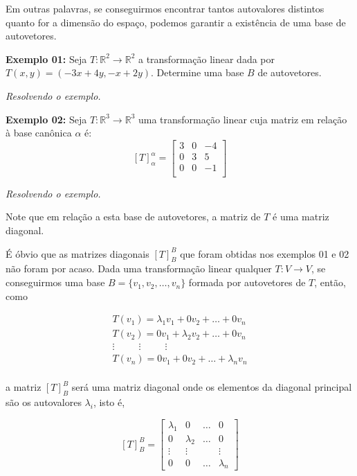 \documentclass[oneside,a4paper,12pt]{article}
\begin{document}
Em outras palavras, se conseguirmos encontrar tantos autovalores distintos quanto for a dimensão do espaço, podemos garantir a existência de uma base de autovetores.

{\bf Exemplo 01:} Seja $T:\mathbb{R}^2 \rightarrow \mathbb{R}^2$ a transformação linear dada por $T(x,y) = (-3x + 4y, -x + 2y)$. Determine uma base $B$ de autovetores.

\vspace{50pt}
\emph{Resolvendo o exemplo.}

{\bf Exemplo 02:} Seja $T: \mathbb{R}^3 \rightarrow \mathbb{R}^3$ uma transformação linear cuja matriz em relação à base canônica $\alpha$ é:
$$[T]^{\alpha}_{\alpha} = \left[
\begin{array}{ccc}
3	&	0	&	-4\\
0	&	3	&	5 \\
0	&	0	&	-1	\\
\end{array}
\right]$$

\vspace{50pt}
\emph{Resolvendo o exemplo.}

Note que em relação a esta base de autovetores, a matriz de $T$ é uma matriz diagonal.

É óbvio que as matrizes diagonais $[T]_{B}^{B}$ que foram obtidas nos exemplos 01 e 02 não foram por acaso. Dada uma transformação linear qualquer $T:V \rightarrow V$, se conseguirmos uma base $B=\{ v_1, v_2, \dots, v_n \}$ formada por autovetores de $T$, então, como

\begin{eqnarray*}
	T(v_1) = \lambda_1 v_1 + 0v_2 + \dots + 0v_n \\
	T(v_2) = 0v_1 + \lambda_2 v_2 + \dots + 0v_n \\
	\vdots \hspace{30pt} \vdots \hspace{30pt} \vdots \hspace{40pt} \\
	T(v_n) = 0v_1 + 0v_2 + \dots + \lambda_n v_n \\
\end{eqnarray*}

a matriz $[T]_{B}^{B}$ será uma matriz diagonal onde os elementos da diagonal principal são os autovalores $\lambda _i$, isto é, 

$$[T]_{B}^{B} = \left[
\begin{array}{cccc}
\lambda_1	&	0		&	\dots	&	0\\
0		&	\lambda_2	&	\dots	&	0 \\
\vdots	&	\vdots	&			&	\vdots	\\
0		&	0		&	\dots	&	\lambda_n
\end{array}
\right]$$
\end{document}
